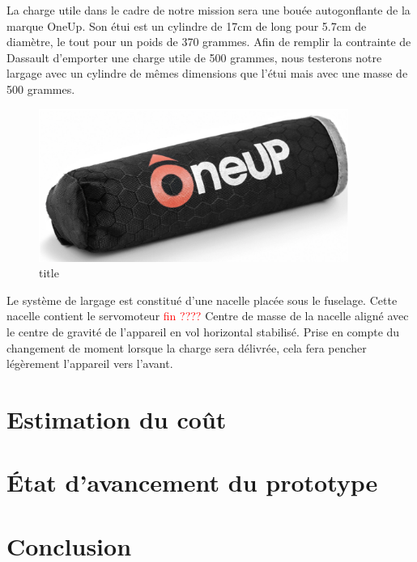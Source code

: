 \documentclass[a4paper,12pt,french]{report}
\begin{document}
La charge utile dans le cadre de notre mission sera une bouée autogonflante de la marque OneUp. Son étui est un cylindre de 17cm de long pour 5.7cm de diamètre, le tout pour un poids de 370 grammes. Afin de remplir la contrainte de Dassault d’emporter une charge utile de 500 grammes, nous testerons notre largage avec un cylindre de mêmes dimensions que l’étui mais avec une masse de 500 grammes.

\begin{figure}[h]
    \centering
    \includegraphics[height=5cm]{figures/bouee.png}
    \caption{title}
\end{figure}

Le système de largage est constitué d’une nacelle placée sous le fuselage. Cette nacelle contient le servomoteur \textcolor{red}{fin ????}
Centre de masse de la nacelle aligné avec le centre de gravité de l’appareil en vol horizontal stabilisé. Prise en compte du changement de moment lorsque la charge sera délivrée, cela fera pencher légèrement l’appareil vers l’avant.


\chapter{Estimation du coût}

\chapter{État d'avancement du prototype}

\chapter*{Conclusion}
\end{document}

